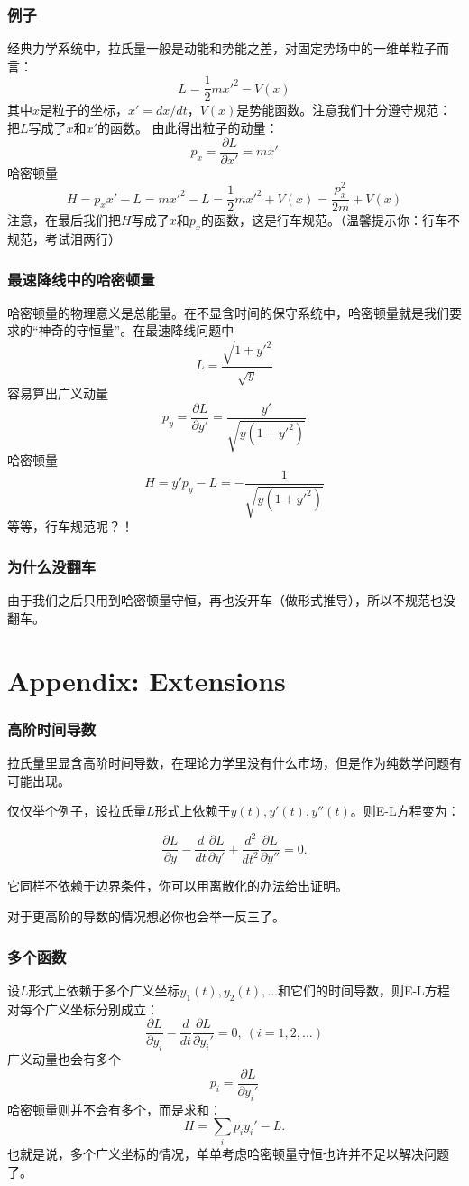 \documentclass[CJK]{beamer}
\begin{document}
\begin{frame}
  \frametitle{例子}
  经典力学系统中，拉氏量一般是动能和势能之差，对固定势场中的一维单粒子而言：
  $$L = \frac{1}{2}m x'^2 - V(x)$$
  其中$x$是粒子的坐标，$x'=dx/dt$，$V(x)$是势能函数。注意我们十分遵守规范：把$L$写成了$x$和$x'$的函数。
  由此得出粒子的动量：
  $$ p_x = \frac{\partial L}{\partial x'} = mx'$$
  哈密顿量
  $$ H = p_x x' - L = mx'^2 - L = \frac{1}{2}mx'^2+V(x) =\frac{p_x^2}{2m}+V(x)$$
  注意，在最后我们把$H$写成了$x$和$p_x$的函数，这是行车规范。（温馨提示你：行车不规范，考试泪两行）
\end{frame}


\begin{frame}
  \frametitle{最速降线中的哈密顿量}
  哈密顿量的物理意义是总能量。在不显含时间的保守系统中，哈密顿量就是我们要求的“神奇的守恒量”。在最速降线问题中
  $$L = \frac{\sqrt{1+y'^2}}{\sqrt{y}} $$
  容易算出广义动量
  $$ p_y = \frac{\partial L}{\partial y'} = \frac{y'}{\sqrt{y(1+y'^2)}}$$
    哈密顿量
    $$ H = y' p_y-L = -\frac{1}{\sqrt{y(1+y'^2)}} $$
    等等，行车规范呢？！
\end{frame}


\begin{frame}
  \frametitle{为什么没翻车}
  由于我们之后只用到哈密顿量守恒，再也没开车（做形式推导），所以不规范也没翻车。

\end{frame}

\section{Appendix: Extensions}

\begin{frame}
  \frametitle{高阶时间导数}
  拉氏量里显含高阶时间导数，在理论力学里没有什么市场，但是作为纯数学问题有可能出现。

  仅仅举个例子，设拉氏量$L$形式上依赖于$y(t), y'(t), y''(t)$。则E-L方程变为：

  $$\frac{\partial L}{\partial y} - \frac{d}{dt} \frac{\partial L}{\partial y'} + \frac{d^2}{dt^2}\frac{\partial L}{\partial y''} = 0.$$

  它同样不依赖于边界条件，你可以用离散化的办法给出证明。

  \skiplines
  
  对于更高阶的导数的情况想必你也会举一反三了。
\end{frame}


\begin{frame}
  \frametitle{多个函数}
  设$L$形式上依赖于多个广义坐标$y_1(t), y_2(t),\dots$和它们的时间导数，则E-L方程对每个广义坐标分别成立：
  $$ \frac{\partial L}{\partial y_i} - \frac{d}{dt} \frac{\partial L}{\partial y_i'}=0, \ (i=1,2,\ldots)$$
  广义动量也会有多个
  $$p_i = \frac{\partial L}{\partial y_i'}$$
  哈密顿量则并不会有多个，而是求和：
  $$ H = \sum_i p_i y_i' - L.$$
  也就是说，多个广义坐标的情况，单单考虑哈密顿量守恒也许并不足以解决问题了。
\end{frame}
\end{document}
